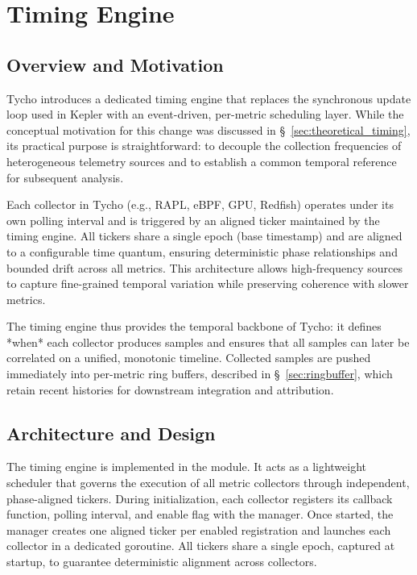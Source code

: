 \section{Timing Engine}
\label{sec:tycho_timing_engine}

\subsection{Overview and Motivation}
\label{subsec:tycho_timing_overview}

Tycho introduces a dedicated timing engine that replaces the synchronous update loop used in Kepler with an event-driven, per-metric scheduling layer.  
While the conceptual motivation for this change was discussed in \S~\ref{sec:theoretical_timing}, its practical purpose is straightforward: to decouple the collection frequencies of heterogeneous telemetry sources and to establish a common temporal reference for subsequent analysis.

Each collector in Tycho (e.g., RAPL, eBPF, GPU, Redfish) operates under its own polling interval and is triggered by an aligned ticker maintained by the timing engine.  
All tickers share a single epoch (base timestamp) and are aligned to a configurable time quantum, ensuring deterministic phase relationships and bounded drift across all metrics.  
This architecture allows high-frequency sources to capture fine-grained temporal variation while preserving coherence with slower metrics.

The timing engine thus provides the temporal backbone of Tycho: it defines *when* each collector produces samples and ensures that all samples can later be correlated on a unified, monotonic timeline.  
Collected samples are pushed immediately into per-metric ring buffers, described in \S~\ref{sec:ringbuffer}, which retain recent histories for downstream integration and attribution.

\subsection{Architecture and Design}
\label{subsec:tycho_timing_design}

The timing engine is implemented in the  module.  
It acts as a lightweight scheduler that governs the execution of all metric collectors through independent, phase-aligned tickers.  
During initialization, each collector registers its callback function, polling interval, and enable flag with the manager.  
Once started, the manager creates one aligned ticker per enabled registration and launches each collector in a dedicated goroutine.  
All tickers share a single epoch, captured at startup, to guarantee deterministic alignment across collectors.

